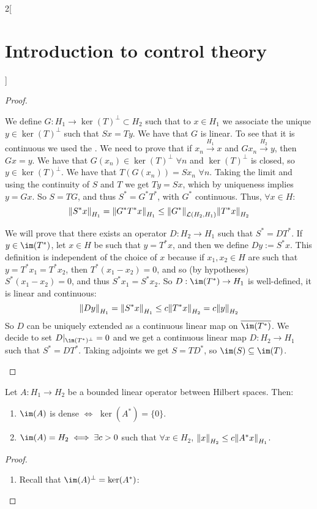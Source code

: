 \documentclass[../../../main_math.tex]{subfiles}
\begin{document}
\begin{multicols}{2}[\section{Introduction to control theory}]
\begin{proof}
\begin{itemizeiff}
\begin{itemize}
      \end{itemize}
      We define $G:H_1\to \ker(T)^\perp\subset H_2$ such that to $x\in H_1$ we associate the unique $y\in \ker(T)^\perp$ such that $Sx=Ty$. We have that $G$ is linear. To see that it is continuous we used the . We need to prove that if $x_n\overset{H_1}{\longrightarrow} x$ and $Gx_n\overset{H_2}{\longrightarrow} y$, then $Gx=y$. We have that $G(x_n)\in \ker(T)^\perp$ $\forall n$ and $\ker(T)^\perp$ is closed, so $y\in \ker(T)^\perp$. We have that $T(G(x_n))=Sx_n$ $\forall n$. Taking the limit and using the continuity of $S$ and $T$ we get $Ty=Sx$, which by uniqueness implies $y=Gx$. So $S=TG$, and thus $S^*=G^*T^*$, with $G^*$ continuous. Thus, $\forall x\in H$:
      $$
        \norm{S^*x}_{H_1}=\norm{G^*T^*x}_{H_1}\leq \norm{G^*}_{\mathcal{L}(H_2,H_1)}\norm{T^*x}_{H_2}
      $$
      \item We will prove that there exists an operator $D:H_2\to H_1$ such that $S^*=DT^*$. If $y\in\im(T^*)$, let $x\in H$ be such that $y=T^*x$, and then we define $Dy:=S^*x$. This definition is independent of the choice of $x$ because if $x_1,x_2\in H$ are such that $y=T^*x_1=T^*x_2$, then $T^*(x_1-x_2)=0$, and so (by hypotheses) $S^*(x_1-x_2)=0$, and thus $S^*x_1=S^*x_2$. So $D:\im(T^*)\to H_1$ is well-defined, it is linear and continuous:
      $$
        \norm{Dy}_{H_1}=\norm{S^*x}_{H_1}\leq c\norm{T^*x}_{H_2}=c\norm{y}_{H_2}
      $$
      So $D$ can be uniquely extended as a continuous linear map on $\overline{\im(T^*)}$. We decide to set $D|_{\im(T^*)^\perp}= 0$ and we get a continuous linear map $D:H_2\to H_1$ such that $S^*=DT^*$. Taking adjoints we get $S=TD^*$, so $\im(S)\subseteq \im(T)$.
    \end{itemizeiff}
  \end{proof}
  \begin{theorem}
    Let $A:H_1\to H_2$ be a bounded linear operator between Hilbert spaces. Then:
    \begin{enumerate}
      \item $\im(A)$ is dense $\iff$ $\ker(A^*)=\{0\}$.
      \item $\im(A)=H_2\iff \exists c>0$ such that $\forall x\in H_2$, $\norm{x}_{H_2}\leq c\norm{A^*x}_{H_1}$.
    \end{enumerate}
  \end{theorem}
  \begin{proof}\hfill
    \begin{enumerate}
      \item Recall that $\im(A)^{\perp}=\ker(A^*)$:

\end{enumerate}
\end{proof}
\end{multicols}
\end{document}
